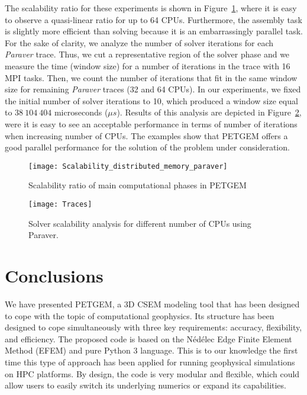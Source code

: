 \documentclass[review]{elsarticle}
\begin{document}
The scalability ratio for these experiments is shown in Figure~\ref{fig:Scalability_distributed_memory_paraver_MNIII}, where it is easy to observe a quasi-linear ratio for up to 64 CPUs. Furthermore, the assembly task is slightly more efficient than solving because it is an embarrassingly parallel task. For the sake of clarity, we analyze the number of solver iterations for each \textit{Paraver} trace. Thus, we cut a representative region of the solver phase and we measure the time (window size) for a number of iterations in the trace with 16 MPI tasks. Then, we count the number of iterations that fit in the same window size for remaining \textit{Paraver} traces (32 and 64 CPUs). In our experiments, we fixed the initial number of solver iterations to 10, which produced a window size equal to $38\:104\:404$ microseconds ($\mu s$). Results of this analysis are depicted in Figure~\ref{fig:Paraver_traces}, were it is easy to see an acceptable performance in terms of number of iterations when increasing number of CPUs. The examples show that PETGEM offers a good parallel performance for the solution of the problem under consideration.
\begin{figure}[htbp!]
\centering
\texttt{[image: Scalability\_distributed\_memory\_paraver]}
\caption{Scalability ratio of main computational phases in PETGEM}
\label{fig:Scalability_distributed_memory_paraver_MNIII}
\end{figure}
\begin{figure}[htbp!]
\centering
\texttt{[image: Traces]}
\caption{Solver scalability analysis for different number of CPUs using Paraver.}
\label{fig:Paraver_traces}
\end{figure}

\section{Conclusions}
\label{Conclusions}
We have presented PETGEM, a 3D CSEM modeling tool that has been designed to cope with the topic of computational geophysics. Its structure has been designed to cope simultaneously with three key requirements: accuracy, flexibility, and efficiency. The proposed code is based on the N\'ed\'elec Edge Finite Element Method (EFEM) and pure Python 3 language. This is to our knowledge the first time this type of approach has been applied for running geophysical simulations on HPC platforms. By design, the code is very modular and flexible, which could allow users to easily switch its underlying numerics or expand its capabilities. 
\end{document}
